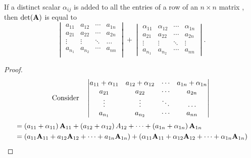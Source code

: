 \vspace{2em}
\begin{theorem}
 If a distinct scalar $\alpha_{ij}$ is added to all the entries of a row of an $n \times n$ matrix , then $\det(\mathbf{A})$ is equal to 
 \[  \begin{vmatrix}
      a_{11} & a_{12} & \cdots & a_{1n}\\
      a_{21} & a_{22} & \cdots & a_{2n}\\
      \vdots & \vdots & \ddots & \ldots\\
      a_{n_1} & a_{n_2} & \cdots & a_{nn}\\ 
    \end{vmatrix} 
    + 
    \begin{vmatrix}
      \alpha_{11} & \alpha_{12} & \cdots & \alpha_{1n}\\
      a_{21} & a_{22} & \cdots & a_{2n}\\
      \vdots & \vdots & \ddots & \vdots\\
      a_{n_1} & a_{n_2} &\cdots& a_{nn}
      \end{vmatrix}.\] 
\end{theorem}
\begin{proof}
  \[
    \text{Consider\ \ \ }
    \begin{vmatrix}
      a_{11}+\alpha_{11} & a_{12}+\alpha_{12} & \cdots & a_{1n}+\alpha_{1n}\\
      a_{21} & a_{22} & \cdots & a_{2n}\\
      \vdots & \vdots & \ddots & \ldots\\
      a_{n_1} & a_{n_2} & \cdots & a_{nn}\\ 
    \end{vmatrix}\\
  \]
  \begin{align*}
    &= \left(a_{11} + \alpha_{11}\right)\mathbf{A}_{11} + \left(a_{12} + \alpha_{12}\right)A_{12} + \cdots + \left( a_{1n} + \alpha_{1n} \right)\mathbf{A}_{1n}\\
    &= (a_{11}\mathbf{A}_{11} + a_{12}\mathbf{A}_{12} + \cdots + a_{1n}\mathbf{A}_{1n}) + \left(\alpha_{11}\mathbf{A}_{11} + \alpha_{12}\mathbf{A}_{12} + \cdots + \alpha_{1n}\mathbf{A}_{1n}\right)\\
  \end{align*}
\end{proof}
